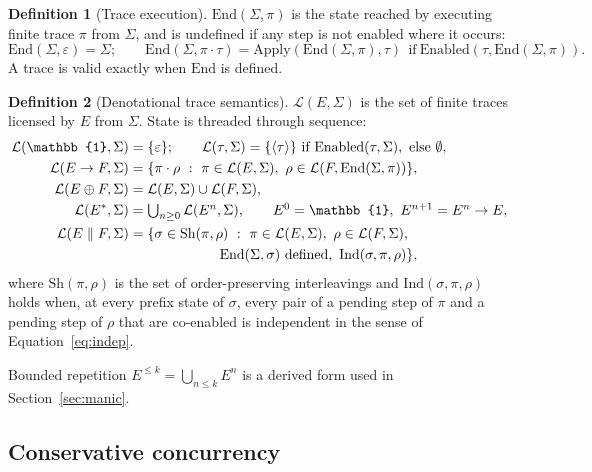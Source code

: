 \documentclass[11pt,letterpaper]{article}
\theoremstyle{definition}
\newtheorem{definition}{Definition}
\newcommand{\St}{\Sigma}
\newcommand{\En}{\mathrm{Enabled}}
\newcommand{\Ap}{\mathrm{Apply}}
\newcommand{\End}{\mathrm{End}}
\newcommand{\Lang}{\mathcal{L}}
\begin{document}
\begin{definition}[Trace execution]
$\End(\St,\pi)$ is the state reached by executing finite trace $\pi$ from $\St$, and is undefined if any step is not enabled where it occurs:
\begin{equation}\label{eq:end}
\End(\St,\varepsilon)=\St;\qquad \End(\St,\pi\cdot\tau)=\Ap(\End(\St,\pi),\tau)\ \ \text{if}\ \En(\tau,\End(\St,\pi)).
\end{equation}
A trace is valid exactly when $\End$ is defined.
\end{definition}

\begin{definition}[Denotational trace semantics]
$\Lang(E,\St)$ is the set of finite traces licensed by $E$ from $\St$. State is threaded through sequence:
\begin{align}
\Lang(\mathbb{1},\St)&=\{\varepsilon\};\qquad \Lang(\tau,\St)=\{\langle\tau\rangle\}\ \text{if}\ \En(\tau,\St),\ \text{else}\ \emptyset, \label{eq:sem1}\\
\Lang(E\rightarrow F,\St)&=\{\pi\cdot\rho\ :\ \pi\in\Lang(E,\St),\ \rho\in\Lang(F,\End(\St,\pi))\},\\
\Lang(E\oplus F,\St)&=\Lang(E,\St)\cup\Lang(F,\St),\\
\Lang(E^{*},\St)&=\textstyle\bigcup_{n\ge0}\Lang(E^{n},\St),\qquad E^{0}=\mathbb{1},\ E^{n+1}=E^{n}\rightarrow E,\\
\Lang(E\parallel F,\St)&=\{\sigma\in\mathrm{Sh}(\pi,\rho)\ :\ \pi\in\Lang(E,\St),\ \rho\in\Lang(F,\St),\notag\\
&\hspace{6.5em}\End(\St,\sigma)\ \text{defined},\ \mathrm{Ind}(\sigma,\pi,\rho)\}, \label{eq:par}
\end{align}
where $\mathrm{Sh}(\pi,\rho)$ is the set of order-preserving interleavings and $\mathrm{Ind}(\sigma,\pi,\rho)$ holds when, at every prefix state of $\sigma$, every pair of a pending step of $\pi$ and a pending step of $\rho$ that are co-enabled is independent in the sense of Equation~\eqref{eq:indep}.
\end{definition}
Bounded repetition $E^{\le k}=\bigcup_{n\le k}E^{n}$ is a derived form used in Section~\ref{sec:manic}.

\subsection{Conservative concurrency}\label{sec:conc}
\end{document}
